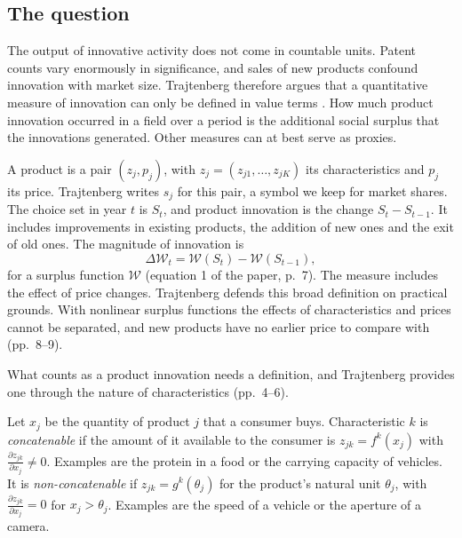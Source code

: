 \subsection{The question}\label{sec:10-ct-question}

The output of innovative activity does not come in countable units. Patent counts vary enormously in
significance, and sales of new products confound innovation with market size. Trajtenberg therefore argues that a
quantitative measure of innovation can only be defined in value terms
\citep[pp.~2--3]{Trajtenberg1985}. How much product innovation occurred in a field over a period is the
additional social surplus that the innovations generated. Other measures can at best serve as proxies.

A product is a pair $(z_j,p_j)$, with $z_j = (z_{j1},\dots,z_{jK})$ its characteristics and $p_j$ its price.
Trajtenberg writes $s_j$ for this pair, a symbol we keep for market shares.
The choice set in year $t$ is $S_t$, and product innovation is the change $S_t - S_{t-1}$. It includes improvements
in existing products, the addition of new ones and the exit of old ones. The magnitude of innovation is
\begin{equation}\label{eq:10-traj-dW}
\Delta\mathcal{W}_t = \mathcal{W}(S_t) - \mathcal{W}(S_{t-1}),
\end{equation}
for a surplus function $\mathcal{W}$ (equation 1 of the paper, p.~7). The measure includes the effect of price
changes. Trajtenberg defends this broad definition on practical grounds. With nonlinear surplus functions the
effects of characteristics and prices cannot be separated, and new products have no earlier price to compare with
(pp.~8--9).

What counts as a product innovation needs a definition, and Trajtenberg provides one through the nature of
characteristics (pp.~4--6).

\begin{definition}\label{def:10-concatenable}
Let $x_j$ be the quantity of product $j$ that a consumer buys. Characteristic $k$ is \emph{concatenable} if the
amount of it available to the consumer is $z_{jk} = f^k(x_j)$ with $\frac{\partial z_{jk}}{\partial x_j} \ne 0$.
Examples are the protein in a food or the carrying capacity of vehicles. It is \emph{non-concatenable} if
$z_{jk} = g^k(\theta_j)$ for the product's natural unit $\theta_j$, with $\frac{\partial z_{jk}}{\partial x_j} = 0$
for $x_j > \theta_j$. Examples are the speed of a vehicle or the aperture of a camera.
\end{definition}

